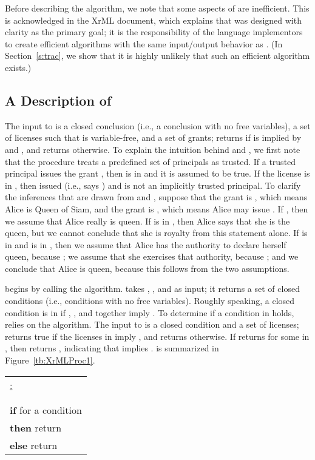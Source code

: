 \documentclass{acmtrans2m}
\newcommand{\<}{
}
\renewcommand{\>}{\rangle}
\begin{document}
Before describing the algorithm, we note that some aspects of  are inefficient.  This is
acknowledged in the XrML document, which explains that  was designed with clarity as the primary
goal; it is the responsibility of the language implementors to create efficient algorithms with the same input/output behavior as .  (In Section~\ref{s:trac}, we show that it is highly unlikely that
such an efficient algorithm exists.)

\subsection{A Description of }\label{sec:XProcdesc}
The input to  is a closed conclusion  (i.e., a conclusion with no free variables), a set
 of licenses  such that  is variable-free, and a set  of grants;  returns
 if  is implied by  and , and returns  otherwise.  To explain the intuition
behind  and , we first note that the procedure treats a predefined set of principals as trusted.
If a trusted principal issues the grant , then  is in  and it is assumed to be true.  If the
license  is in , then  issued  (i.e.,  says ) and  is not an implicitly
trusted principal.  To clarify the inferences that are drawn from  and , suppose that the grant
 is , which means Alice is Queen of Siam, and the grant
 is , which means Alice may issue .  If , then
we assume that Alice really is queen.  If  is in , then Alice says that she
is the queen, but we cannot conclude that she is royalty from this statement alone.  If
 is in  and  is in , then we assume that Alice has the authority to
declare herself queen, because ; we assume that she exercises that authority, because
; and we conclude that Alice is queen, because this follows from the two
assumptions.

 begins by calling the  algorithm.   takes , , and  as input; it returns
a set  of closed conditions (i.e., conditions with no free variables).  Roughly speaking, a closed
condition  is in  if , , and  together imply .  To determine if a condition
in  holds,  relies on the  algorithm.  The input to  is a closed condition
 and a set  of licenses;  returns true if the licenses in  imply , and
returns  otherwise.  If  returns  for some  in , then 
returns , indicating that  implies .   is summarized in
Figure~\ref{tb:XrMLProc1}.

\begin{figure*}[htb]
\begin{center}
\begin{tabular}{|l|}\hline
\underline{:}\\\\
\\
{\bf if}  for a condition \\
{\bf then} return \\
{\bf else} return \\
\hline
\end{tabular}
\end{center}
\caption{The  Algorithm}
\label{tb:XrMLProc1}
\end{figure*}
\end{document}
